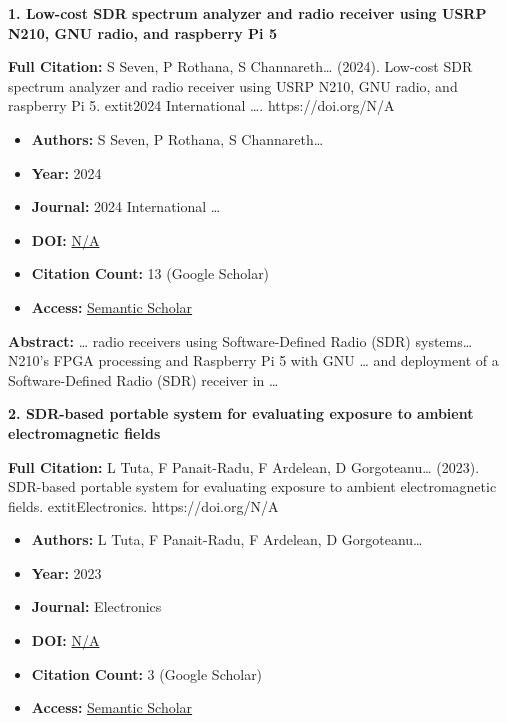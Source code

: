 \documentclass[11pt,a4paper]{article}
\begin{document}
\textbf{1. Low-cost SDR spectrum analyzer and radio receiver using USRP N210, GNU radio, and raspberry Pi 5}

\textbf{Full Citation:} S Seven, P Rothana, S Channareth… (2024). Low-cost SDR spectrum analyzer and radio receiver using USRP N210, GNU radio, and raspberry Pi 5. 	extit{2024 International …}. https://doi.org/N/A

\begin{resultbox}
\begin{itemize}[leftmargin=*]
    \item \textbf{Authors:} S Seven, P Rothana, S Channareth…
    \item \textbf{Year:} 2024
    \item \textbf{Journal:} 2024 International …
    
    
    
    \item \textbf{DOI:} \href{https://doi.org/}{N/A}
    \item \textbf{Citation Count:} 13 (Google Scholar)
    \item \textbf{Access:} \href{https://ieeexplore.ieee.org/abstract/document/10791167/}{Semantic Scholar}
\end{itemize}
\end{resultbox}

\textbf{Abstract:} … radio receivers using Software-Defined Radio (SDR) systems… N210's FPGA processing and Raspberry Pi 5 with GNU … and deployment of a Software-Defined Radio (SDR) receiver in …\par\vspace{0.5em}



\textbf{2. SDR-based portable system for evaluating exposure to ambient electromagnetic fields}

\textbf{Full Citation:} L Tuta, F Panait-Radu, F Ardelean, D Gorgoteanu… (2023). SDR-based portable system for evaluating exposure to ambient electromagnetic fields. 	extit{Electronics}. https://doi.org/N/A

\begin{resultbox}
\begin{itemize}[leftmargin=*]
    \item \textbf{Authors:} L Tuta, F Panait-Radu, F Ardelean, D Gorgoteanu…
    \item \textbf{Year:} 2023
    \item \textbf{Journal:} Electronics
    
    
    
    \item \textbf{DOI:} \href{https://doi.org/}{N/A}
    \item \textbf{Citation Count:} 3 (Google Scholar)
    \item \textbf{Access:} \href{https://www.mdpi.com/2079-9292/12/24/5003}{Semantic Scholar}
\end{itemize}
\end{resultbox}
\end{document}
